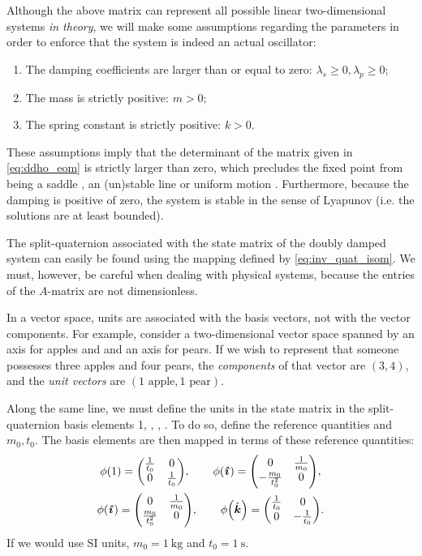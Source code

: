 Although the above matrix can represent all possible linear two-dimensional systems \emph{in theory}, we will make some assumptions regarding the parameters in order to enforce that the system is indeed an actual oscillator:
\begin{enumerate}[label=(\roman*), align=left, leftmargin=1.5cm]
    \item The damping coefficients are larger than or equal to zero: $\lambda_s \geq 0, \lambda_p \geq 0$;
    \item The mass is strictly positive: $m > 0$;
    \item The spring constant is strictly positive: $k > 0$.
\end{enumerate}
These assumptions imply that the determinant of the matrix given in \cref{eq:ddho_eom} is strictly larger than zero, which precludes the fixed point from being a saddle , an (un)stable line  or uniform motion . Furthermore, because the damping is positive of zero, the system is stable in the sense of Lyapunov (i.e. the solutions are at least bounded).

The split-quaternion associated with the state matrix of the doubly damped system can easily be found using the mapping defined by \cref{eq:inv_quat_isom}. We must, however, be careful when dealing with physical systems, because the entries of the \(A\)-matrix are not dimensionless. 

In a vector space, units are associated with the basis vectors, not with the vector components. For example, consider a two-dimensional vector space spanned by an axis for apples and and an axis for pears. If we wish to represent that someone possesses three apples and four pears, the \emph{components} of that vector are \((3, 4)\), and the \emph{unit vectors} are \((1 \text{ apple}, 1\text{ pear})\). 

Along the same line, we must define the units in the state matrix in the split-quaternion basis elements 1, \quati, \quatj, \quatk. To do so, define the reference quantities and \(m_0, t_0\). The basis elements are then mapped in terms of these reference quantities:
\begin{gather}
    \phi\qty(1) = \mqty(\tfrac{1}{t_0} & 0 \\ 0 & \tfrac{1}{t_0}), \qquad 
    \phi\qty(\quati) = \mqty(0 & \tfrac{1}{m_0} \\  -\tfrac{m_0}{t_0^2} & 0), \\
    \phi\qty(\quati) = \mqty(0 & \tfrac{1}{m_0} \\  \tfrac{m_0}{t_0^2} & 0), \qquad
    \phi\qty(\quatk) = \mqty(\tfrac{1}{t_0} & 0 \\ 0 & -\tfrac{1}{t_0}).
\end{gather}
If we would use SI units, \(m_0 = \SI{1}{\kilogram}\) and \(t_0 = \SI{1}{\second}\). 

